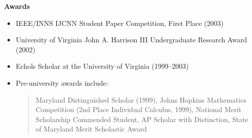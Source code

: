 \documentclass[10pt]{article}
\begin{document}
{\large \textbf{Awards}}
\begin{itemize}
  \item IEEE/INNS IJCNN Student Paper Competition, First Place (2003)
  \item University of Virginia John A. Harrison III Undergraduate Research Award (2002)
  \item Echols Scholar at the University of Virginia (1999--2003)
  \item Pre-university awards include:
\begin{quote}
Maryland Distinguished Scholar (1999), Johns Hopkins Mathematics Competition (2nd Place Individual Calculus, 1999), National Merit Scholarship Commended Student, AP Scholar with Distinction, State of Maryland Merit Scholastic Award
\end{quote}
\end{itemize}
\end{document}
